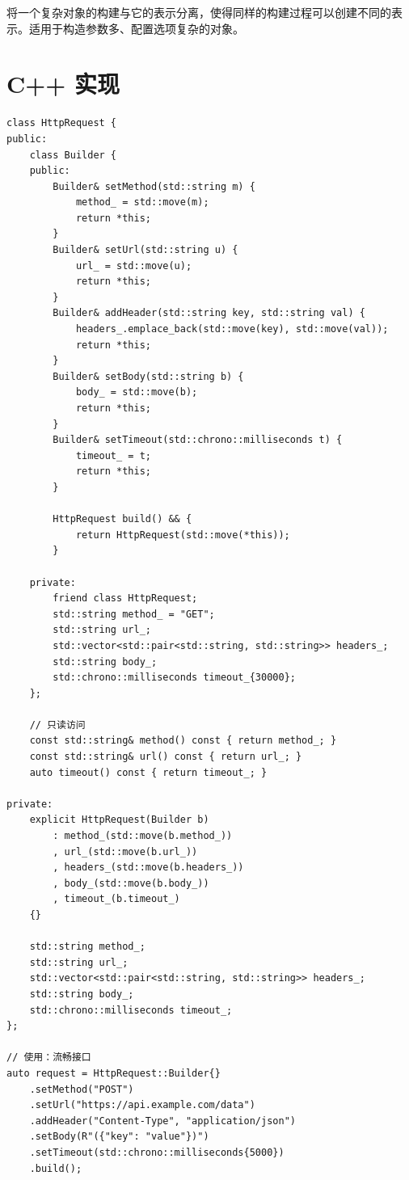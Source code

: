 \documentclass[12pt,a4paper,fontset=fandol]{ctexbook}
\begin{document}
将一个复杂对象的构建与它的表示分离，使得同样的构建过程可以创建不同的表示。适用于构造参数多、配置选项复杂的对象。

\section{C++ 实现}

\begin{lstlisting}[style=cppstyle, caption={建造者模式 --- C++ 实现}]
class HttpRequest {
public:
    class Builder {
    public:
        Builder& setMethod(std::string m) {
            method_ = std::move(m);
            return *this;
        }
        Builder& setUrl(std::string u) {
            url_ = std::move(u);
            return *this;
        }
        Builder& addHeader(std::string key, std::string val) {
            headers_.emplace_back(std::move(key), std::move(val));
            return *this;
        }
        Builder& setBody(std::string b) {
            body_ = std::move(b);
            return *this;
        }
        Builder& setTimeout(std::chrono::milliseconds t) {
            timeout_ = t;
            return *this;
        }

        HttpRequest build() && {
            return HttpRequest(std::move(*this));
        }

    private:
        friend class HttpRequest;
        std::string method_ = "GET";
        std::string url_;
        std::vector<std::pair<std::string, std::string>> headers_;
        std::string body_;
        std::chrono::milliseconds timeout_{30000};
    };

    // 只读访问
    const std::string& method() const { return method_; }
    const std::string& url() const { return url_; }
    auto timeout() const { return timeout_; }

private:
    explicit HttpRequest(Builder b)
        : method_(std::move(b.method_))
        , url_(std::move(b.url_))
        , headers_(std::move(b.headers_))
        , body_(std::move(b.body_))
        , timeout_(b.timeout_)
    {}

    std::string method_;
    std::string url_;
    std::vector<std::pair<std::string, std::string>> headers_;
    std::string body_;
    std::chrono::milliseconds timeout_;
};

// 使用：流畅接口
auto request = HttpRequest::Builder{}
    .setMethod("POST")
    .setUrl("https://api.example.com/data")
    .addHeader("Content-Type", "application/json")
    .setBody(R"({"key": "value"})")
    .setTimeout(std::chrono::milliseconds{5000})
    .build();
\end{lstlisting}
\end{document}
